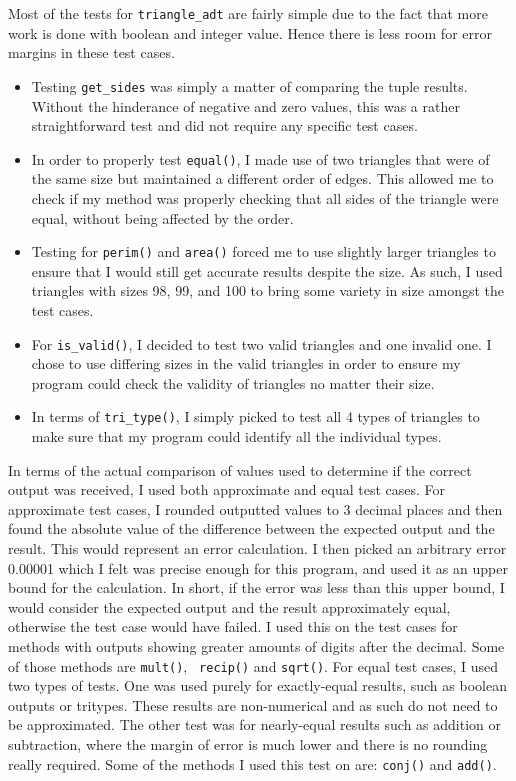 \documentclass[12pt]{article}
\begin{document}
\noindent Most of the tests for \verb|triangle_adt| are fairly simple due to the fact that more work is done with boolean and integer value. Hence there is less room for
error margins in these test cases. 
\begin{itemize}
	\item Testing \verb|get_sides| was simply a matter of comparing the tuple results. 
	Without the hinderance of negative and zero values, this was a rather straightforward test and
	did not require any specific test cases. 
	\item In order to properly test \verb|equal()|, I made use of two triangles that were of
	the same size but maintained a different order of edges. This allowed me to check if my method 
	was properly checking that all sides of the triangle were equal, without being affected
	by the order. 
	\item Testing for \verb|perim()| and \verb|area()| forced me to use slightly larger triangles to ensure 
	that I would still get accurate results despite the size. As such, I used triangles with
	sizes 98, 99, and 100 to bring some variety in size amongst the test cases. 
	\item For \verb|is_valid()|, I decided to test two valid triangles and one invalid one. I chose to
	use differing sizes in the valid triangles in order to ensure my program could check the 
	validity of triangles no matter their size. 
	\item In terms of \verb|tri_type()|, I simply picked to test all 4 types of triangles to make sure that my program could identify all the individual types. 
\end{itemize}

\noindent In terms of the actual comparison of values used to determine if the correct output was 
received, I used both approximate and equal test cases. 
For approximate test cases, I rounded outputted values to 3 decimal places and then 
found the absolute value of the difference between the expected output and the result. This 
would represent an error calculation. I then picked an arbitrary error 0.00001 which I felt 
was precise enough for this program, and used it as an upper bound for the calculation. In short, 
if the error was less than this upper bound, I would consider the expected output and the 
result approximately equal, otherwise the test case would have failed. I used this on the
test cases for methods with outputs showing greater amounts of digits after the decimal. 
Some of those methods are \verb|mult()|, \verb| recip()| and \verb|sqrt()|.
For equal test cases, I used two types of tests. One was used purely for exactly-equal 
results, such as boolean outputs or tritypes. These results are non-numerical and as such 
do not need to be approximated. The other test was for nearly-equal results such as 
addition or subtraction, where the margin of error is much lower and there is no rounding
really required. Some of the methods I used this test on are: \verb|conj()| and \verb|add()|.
\end{document}
